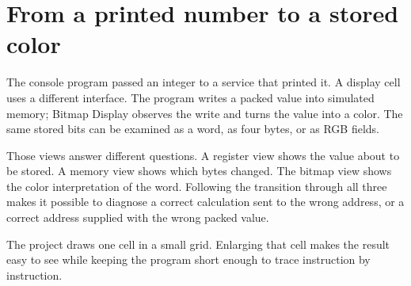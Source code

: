 \section{From a printed number to a stored
  color}\label{002-single-pixel-p00-from-a-printed-number-to-a-stored-color}

The console program passed an integer to a service that printed it. A
display cell uses a different interface. The program writes a packed
value into simulated memory; Bitmap Display observes the write and turns
the value into a color. The same stored bits can be examined as a word,
as four bytes, or as RGB fields.

Those views answer different questions. A register view shows the value
about to be stored. A memory view shows which bytes changed. The bitmap
view shows the color interpretation of the word. Following the
transition through all three makes it possible to diagnose a correct
calculation sent to the wrong address, or a correct address supplied
with the wrong packed value.

The project draws one cell in a small grid. Enlarging that cell makes
the result easy to see while keeping the program short enough to trace
instruction by instruction.
